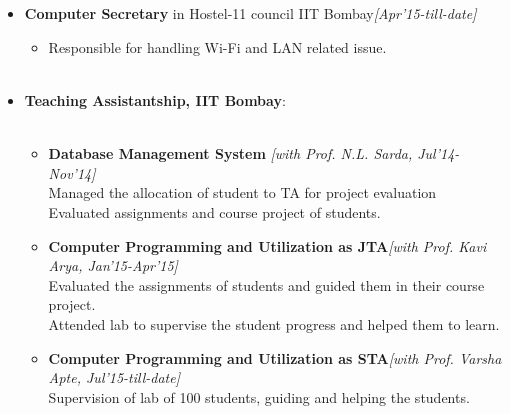 \\[-0.7cm]\\
\begin{itemize}
        \item \textbf{Computer Secretary} in Hostel-11 council IIT Bombay\hfill \emph{[Apr'15-till-date]}\hfill \\[-0.7cm]
	\begin{itemize}
		\item Responsible for handling Wi-Fi and LAN related issue. \\[- 0.8cm]\\
	\end{itemize}	
	\item \textbf{Teaching Assistantship, IIT Bombay}: \hfill \\[- 1.1cm]\\
	\begin{itemize}
		\item \textbf{Database Management System} \hfill \emph{[with Prof. N.L. Sarda, Jul'14-Nov'14]}\\
			Managed the allocation of student to TA for project evaluation\\
			Evaluated assignments and course project of students.
		\item \textbf{Computer Programming and Utilization as JTA}\hfill \emph{[with Prof. Kavi Arya, Jan'15-Apr'15]}\\
			Evaluated the assignments of students and guided them in their course project.\\
			Attended lab to supervise the student progress and helped them to learn.
		\item \textbf{Computer Programming and Utilization as STA}\hfill \emph{[with Prof. Varsha Apte, Jul'15-till-date]}\\
			Supervision of lab of 100 students, guiding and helping the students.\\[-0.4cm]
	\end{itemize}
\end{itemize}
